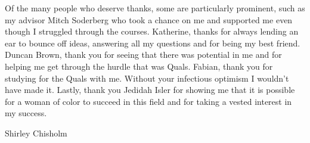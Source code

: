 \begin{acknowledgements}
  Of the many people who deserve thanks, some are particularly prominent,
  such as my advisor Mitch Soderberg who took a chance on me and supported me even though I struggled through the courses. Katherine, thanks for always lending an ear to bounce off ideas, answering all my questions and for being my best friend. Duncan Brown, thank you for seeing that there was potential in me and for helping me get through the hurdle that was Quals. Fabian, thank you for studying for the Quals with me. Without your infectious optimism I wouldn't have made it. Lastly, thank you Jedidah Isler for showing me that it is possible for a woman of color to succeed in this field and for taking a vested interest in my success.     
\end{acknowledgements}




{\tableofcontents \let\cleardoublepage\clearpage \listoffigures \let\cleardoublepage\clearpage \listoftables}

%
  {Shirley Chisholm}
\thispagestyle{empty}
